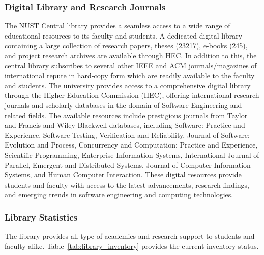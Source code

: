 \subsubsection{Digital Library and Research Journals }\label{Digital ibrary}
The NUST Central library provides a seamless access to a wide range of educational resources to its faculty and students. A dedicated digital library containing a large collection of research papers, theses (23217), e-books (245), and project research archives are available through HEC. In addition to this, the central library subscribes to several other IEEE and ACM journals/magazines of international repute in hard-copy form which are readily available to the faculty and students. The university provides access to a comprehensive digital library through the Higher Education Commission (HEC), offering international research journals and scholarly databases in the domain of Software Engineering and related fields. The available resources include prestigious journals from Taylor and Francis and Wiley-Blackwell databases, including Software: Practice and Experience, Software Testing, Verification and Reliability, Journal of Software: Evolution and Process, Concurrency and Computation: Practice and Experience, Scientific Programming, Enterprise Information Systems, International Journal of Parallel, Emergent and Distributed Systems, Journal of Computer Information Systems, and Human Computer Interaction. These digital resources provide students and faculty with access to the latest advancements, research findings, and emerging trends in software engineering and computing technologies.


\subsubsection{Library Statistics }\label{library statistics}
The library provides all type of academics and research support to
students and faculty alike. Table~\ref{tab:library_inventory} provides the current inventory status.

